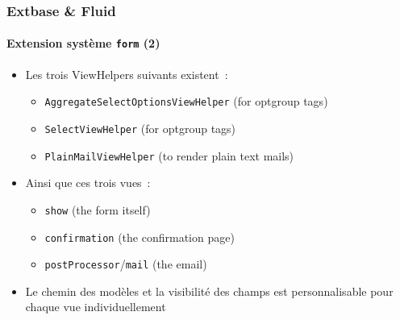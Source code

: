\begin{frame}[fragile]
	\frametitle{Extbase \& Fluid}
	\framesubtitle{Extension système \texttt{form} (2)}

	\begin{itemize}

		\item Les trois ViewHelpers suivants existent~:

			\begin{itemize}
				\item \texttt{AggregateSelectOptionsViewHelper} (for optgroup tags)
				\item \texttt{SelectViewHelper} (for optgroup tags)
				\item \texttt{PlainMailViewHelper} (to render plain text mails)
			\end{itemize}

		\item Ainsi que ces trois vues~:

			\begin{itemize}
				\item \texttt{show} (the form itself)
				\item \texttt{confirmation} (the confirmation page)
				\item \texttt{postProcessor}/\texttt{mail} (the email)
			\end{itemize}

		\item Le chemin des modèles et la visibilité des champs est personnalisable
			pour chaque vue individuellement

	\end{itemize}

\end{frame}



